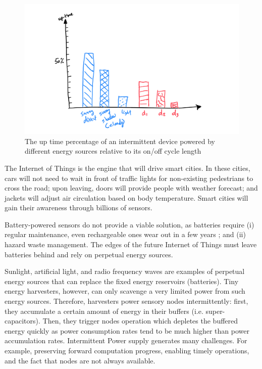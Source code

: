 
\begin{figure}
	\centering
		\includegraphics[width=\columnwidth]{figures/intermittent_problem}
		\caption{The up time percentage of an intermittent device powered by different energy sources relative to its on/off cycle length}
		\label{fig:disInterSys}
\end{figure}



The Internet of Things is the engine that will drive smart cities. In these cities, cars will not need to wait in front of traffic lights for non-existing pedestrians to cross the road; upon leaving, doors will provide people with weather forecast; and jackets will adjust air circulation based on body temperature. Smart cities will gain their awareness through billions of sensors.

Battery-powered sensors do not provide a viable solution, as batteries require (i) regular maintenance, even rechargeable ones wear out in a few years \cite{xxx}; and (ii) hazard waste management. The edges of the future Internet of Things must leave batteries behind and rely on perpetual energy sources. 

Sunlight, artificial light, and radio frequency waves are examples of perpetual energy sources that can replace the fixed energy reservoirs (batteries). Tiny energy harvesters, however, can only scavenge a very limited power from such energy sources. Therefore, harvesters power sensory nodes intermittently: first, they accumulate a certain amount of energy in their buffers (i.e. super-capacitors). Then, they trigger nodes operation which depletes the buffered energy quickly as power consumption rates tend to be much higher than power accumulation rates. Intermittent Power supply generates many challenges. For example, preserving forward computation progress, enabling timely operations, and the fact that nodes are not always available. 

